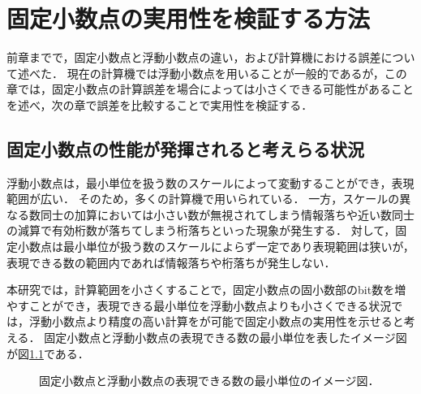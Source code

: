 \chapter {固定小数点の実用性を検証する方法}
\label{chap:提案手法}
前章までで，固定小数点と浮動小数点の違い，および計算機における誤差について述べた．
現在の計算機では浮動小数点を用いることが一般的であるが，この章では，固定小数点の計算誤差を場合によっては小さくできる可能性があることを述べ，次の章で誤差を比較することで実用性を検証する．

\section{固定小数点の性能が発揮されると考えらる状況}
浮動小数点は，最小単位を扱う数のスケールによって変動することができ，表現範囲が広い．
そのため，多くの計算機で用いられている．
一方，スケールの異なる数同士の加算においては小さい数が無視されてしまう情報落ちや近い数同士の減算で有効桁数が落ちてしまう桁落ちといった現象が発生する．
対して，固定小数点は最小単位が扱う数のスケールによらず一定であり表現範囲は狭いが，表現できる数の範囲内であれば情報落ちや桁落ちが発生しない．


本研究では，計算範囲を小さくすることで，固定小数点の固小数部のbit数を増やすことができ，表現できる最小単位を浮動小数点よりも小さくできる状況では，浮動小数点より精度の高い計算をが可能で固定小数点の実用性を示せると考える．
固定小数点と浮動小数点の表現できる数の最小単位を表したイメージ図が図\ref{fig:fixed_float_image}である．

\begin{figure}[H]
    \centering
    \caption{固定小数点と浮動小数点の表現できる数の最小単位のイメージ図．}
    \label{fig:fixed_float_image}
\end{figure}

